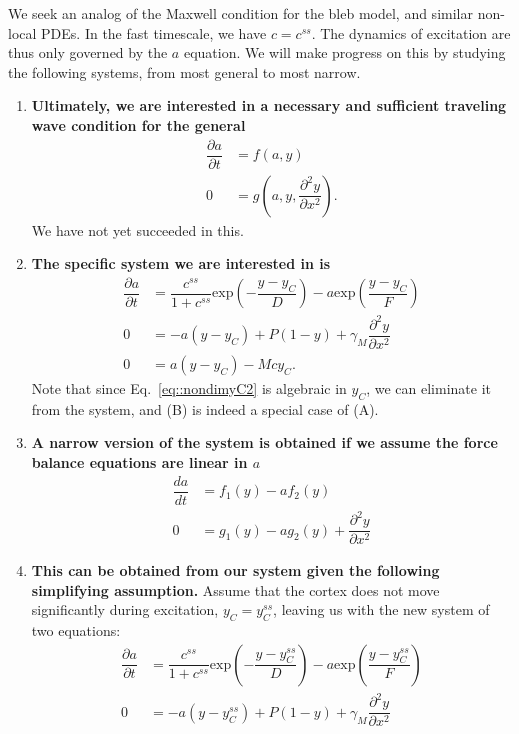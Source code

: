 We seek an analog of the Maxwell condition for the bleb model, and similar non-local PDEs. In the fast timescale, we have $c = c^{ss}$.  The dynamics of excitation are thus only governed by the $a$ equation. We will make progress on this by studying the following systems, from most general to most narrow.
\begin{enumerate}[label=(\Alph*)]
\item \textbf{Ultimately, we are interested in a necessary and sufficient traveling wave condition for the general}
\begin{align}
\dfrac{\partial a}{ \partial t}  & =  f(a,y)\\
0 & =g \left(a,y,\dfrac{\partial^2 y}{\partial x^2}\right).
\end{align}
We have not yet succeeded in this. 
\item\textbf{The specific system we are interested in is}
\begin{align}
\dfrac{\partial a}{ \partial t}  & =  \dfrac{c^{ss}}{1+c^{ss}} \mbox{exp}\left(-\dfrac{y-y_C}{D}\right) - a \mbox{exp} \left(\dfrac{y-y_C}{F} \right)\label{eq::a_ODE}\\
0 & = -a(y - y_C) + P (1-y) + \gamma_M \dfrac{\partial^2 y}{\partial x^2}\label{eq::yM_eq} \\
0 & = a(y-y_C) - Mcy_C\label{eq::nondimyC2}.
\end{align} 
Note that since Eq.~\ref{eq::nondimyC2} is algebraic in $y_C$, we can eliminate it from the system, and (B) is indeed a special case of (A). 
\item \textbf{A narrow version of the system is obtained if we assume the force balance equations are linear in $a$}
\begin{align}
\dfrac{da}{ dt}  & = f_1(y) - a f_2(y)\label{eq::gen_a}\\
0 & = g_1(y) - ag_2(y) +  \dfrac{\partial^2 y}{\partial x^2}\label{eq::gen_ym}
\end{align}
\item \textbf{This can be obtained from our system given the following simplifying assumption.} Assume that the cortex does not move significantly during excitation, $y_C = y_C^{ss}$, leaving us with the new system of two equations:
\begin{align}
\dfrac{\partial a}{ \partial t}  & =  \dfrac{c^{ss}}{1+c^{ss}} \mbox{exp}\left(-\dfrac{y-y_C^{ss}}{D}\right) - a \mbox{exp} \left(\dfrac{y-y_C^{ss}}{F} \right)\label{eq::a_ODE}\\
0 & = -a(y - y_C^{ss}) + P (1-y) + \gamma_M \dfrac{\partial^2 y}{\partial x^2}\label{eq::yM_eq}
\end{align} 
\end{enumerate}
